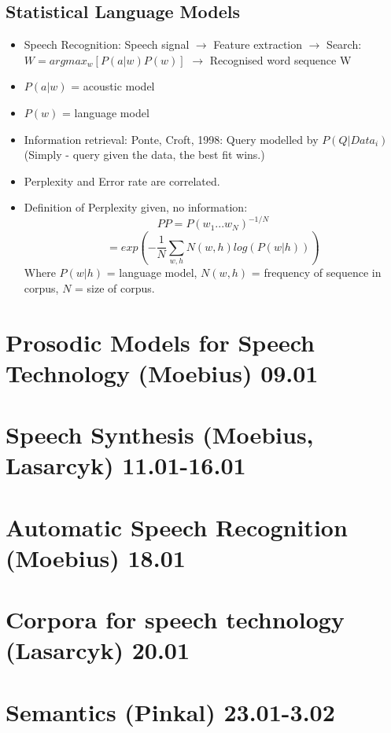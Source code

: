 \documentclass[11pt]{article}
\newenvironment{itemise}{
\begin{itemize}
  \setlength{\itemsep}{1pt}
  \setlength{\parskip}{0pt}
  \setlength{\parsep}{0pt}
}{\end{itemize}}
\begin{document}
\subsection{Statistical Language Models}
\begin{itemise}
\item Speech Recognition: Speech signal $\rightarrow$ Feature extraction $\rightarrow$ Search: $W = argmax_w[P(a|w)P(w)]$ $\rightarrow$ Recognised word sequence W
\item $P(a|w)$ = acoustic model
\item $P(w)$ = language model
\item Information retrieval: Ponte, Croft, 1998: Query modelled by $P(Q|Data_i)$ (Simply - query given the data, the best fit wins.)
\item Perplexity and Error rate are correlated. 
\item Definition of Perplexity given, no information: \begin{equation} PP = P(w_1...w_N)^{-1/N}\end{equation}
\begin{equation} = exp(-\frac{1}{N}\sum_{w,h}N(w,h)log(P(w|h)))\end{equation}
Where $P(w|h)$ = language model, $N(w,h)$ = frequency of sequence in corpus, $N$  = size of corpus.
\end{itemise}


\section{Prosodic Models for Speech Technology (Moebius) 09.01}

\section{Speech Synthesis (Moebius, Lasarcyk) 11.01-16.01}

\section{Automatic Speech Recognition (Moebius) 18.01}

\section{Corpora for speech technology (Lasarcyk) 20.01}

\section{Semantics (Pinkal) 23.01-3.02}
\end{document}
